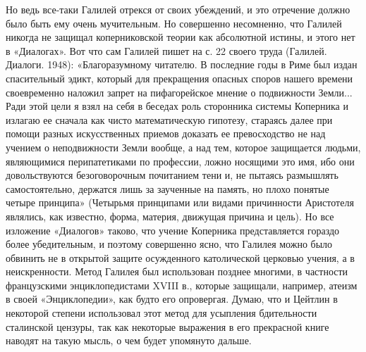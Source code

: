 Но ведь все-таки Галилей отрекся от своих убеждений, и это отречение должно
было быть ему очень мучительным. Но совершенно несомненно, что Галилей никогда
не защищал коперниковской теории как абсолютной истины, и этого нет в
«Диалогах». Вот что сам Галилей пишет на с. 22 своего труда (Галилей. Диалоги.
1948): «Благоразумному читателю. В последние годы в Риме был издан спасительный
эдикт, который для прекращения опасных споров нашего времени своевременно
наложил запрет на пифагорейское мнение о подвижности Земли... Ради этой цели я
взял на себя в беседах роль сторонника системы Коперника и излагаю ее сначала
как чисто математическую гипотезу, стараясь далее при помощи разных
искусственных приемов доказать ее превосходство не над учением о неподвижности
Земли вообще, а над тем, которое защищается людьми, являющимися перипатетиками
по профессии, ложно носящими это имя, ибо они довольствуются безоговорочным
почитанием тени и, не пытаясь размышлять самостоятельно, держатся лишь за
заученные на память, но плохо понятые четыре принципа» (Четырьмя принципами или
видами причинности Аристотеля являлись, как известно, форма, материя, движущая
причина и цель). Но все изложение «Диалогов» таково, что учение Коперника
представляется гораздо более убедительным, и поэтому совершенно ясно, что
Галилея можно было обвинить не в открытой защите осужденного католической
церковью учения, а в неискренности. Метод
Галилея был использован позднее многими, в частности французскими
энциклопедистами XVIII в., которые защищали, например, атеизм в своей
«Энциклопедии», как будто его опровергая. Думаю, что и Цейтлин в некоторой
степени использовал этот метод для усыпления бдительности сталинской цензуры,
так как некоторые выражения в его прекрасной книге наводят на такую мысль, о
чем будет упомянуто дальше.

